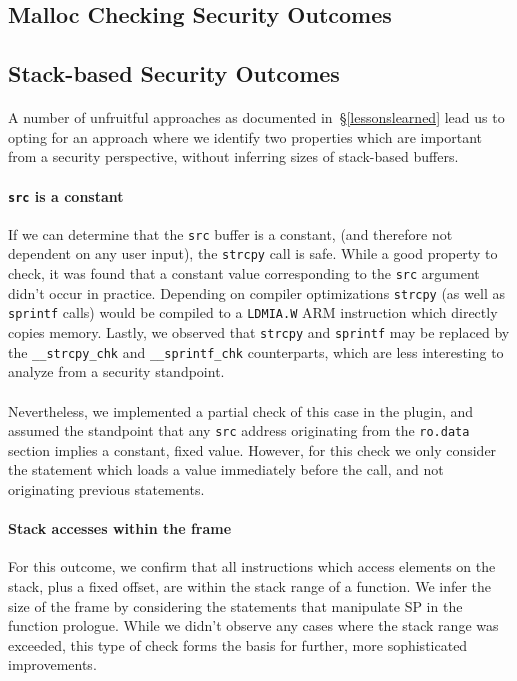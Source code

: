 \documentclass[letterpaper,11pt]{article}
\begin{document}
\subsection{Malloc Checking Security Outcomes}

\subsection{Stack-based Security Outcomes}
\label{stackoutcomes}

\paragraph{}
A number of unfruitful approaches as documented in~\S\ref{lessonslearned} lead us
to opting for an approach where we identify two properties which are important
from a security perspective, without inferring sizes of stack-based buffers.

\paragraph{\texttt{src} is a constant}
If we can determine that the \texttt{src} buffer is a constant, (and therefore
not dependent on any user input), the \texttt{strcpy} call is safe. While a
good property to check, it was found that a constant value corresponding to the
\texttt{src} argument didn't occur in practice. Depending on compiler
optimizations \texttt{strcpy} (as well as \texttt{sprintf} calls) would be
compiled to a \texttt{LDMIA.W} ARM instruction which directly copies memory.
Lastly, we observed that \texttt{strcpy} and \texttt{sprintf} may be replaced
by the \texttt{\_\_strcpy\_chk} and \texttt{\_\_sprintf\_chk} counterparts,
which are less interesting to analyze from a security standpoint.

\paragraph{}
Nevertheless, we implemented a partial check of this case in the plugin, and
assumed the standpoint that any \texttt{src} address originating from the
\texttt{ro.data} section implies a constant, fixed value. However, for this
check we only consider the statement which loads a value immediately before the
call, and not originating previous statements. %

\paragraph{Stack accesses within the frame}
For this outcome, we confirm that all instructions which access elements on
the stack, plus a fixed offset, are within the stack range of a function. We
infer the size of the frame by considering the statements that manipulate
SP in the function prologue. While we didn't observe any cases where the
stack range was exceeded, this type of check forms the basis for further,
more sophisticated improvements.
\end{document}
